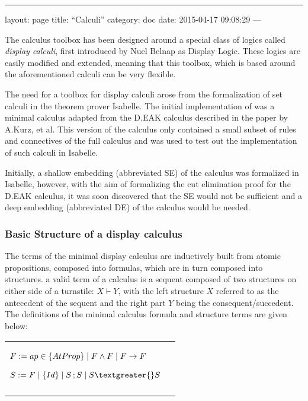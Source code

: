 
\begin{center}\rule{3in}{0.4pt}\end{center}

layout: page title: ``Calculi'' category: doc date: 2015-04-17 09:08:29
---

The calculus toolbox has been designed around a special class of logics
called \emph{display calculi}, first introduced by Nuel Belnap as
Display Logic. These logics are easily modified and extended, meaning
that this toolbox, which is based around the aforementioned calculi can
be very flexible.

The need for a toolbox for display calculi arose from the formalization
of set calculi in the theorem prover Isabelle. The initial
implementation of was a minimal calculus adapted from the D.EAK calculus
described in the paper by A.Kurz, et al. This version of the calculus
only contained a small subset of rules and connectives of the full
calculus and was used to test out the implementation of such calculi in
Isabelle.

Initially, a shallow embedding (abbreviated SE) of the calculus was
formalized in Isabelle, however, with the aim of formalizing the cut
elimination proof for the D.EAK calculus, it was soon discovered that
the SE would not be sufficient and a deep embedding (abbreviated DE) of
the calculus would be needed.

\subsubsection{Basic Structure of a display
calculus}\label{basic-structure-of-a-display-calculus}

The terms of the minimal display calculus are inductively built from
atomic propositions, composed into formulas, which are in turn composed
into structures. a valid term of a calculus is a sequent composed of two
structures on either side of a turnstile: $X \vdash Y$,
with the left structure $X$ referred to as the antecedent of the
sequent and the right part $Y$ being the consequent/succedent. The
definitions of the minimal calculus formula and structure terms are
given below:

\begin{longtable}[c]{@{}ll@{}}
\toprule\addlinespace
\begin{minipage}[t]{0.47\columnwidth}\raggedright
$F:= ap \in \mathsf\{AtProp\}
\mid F \land F \mid F
\rightarrow F$

$S:= F \mid \mathsf\{Id\}
\mid S \,; S \mid S
\textgreater{} S$
\end{minipage}
\\\addlinespace
\bottomrule
\end{longtable}

